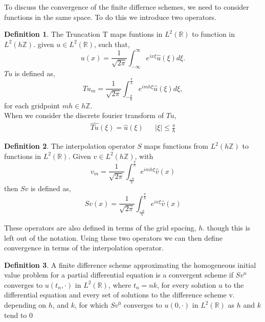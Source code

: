 \documentclass[12pt]{article}
\newcommand{\R}{\mathbb{R}}
\newcommand{\Z}{\mathbb{Z}}
\theoremstyle{definition}
\newtheorem{definition}{Definition}
\begin{document}
To discuss the convergence of the finite differnce schemes, we need to consider functions in the same space. To do this we introduce two operators. 
\begin{definition}
The Truncation T maps funtions in $L^2(\R)$ to function in $L^2(h\Z)$. given $u \in L^2(\R)$, such that,
\begin{equation}
u(x)=\frac{1}{\sqrt{2\pi}}\int_{-\infty}^{\infty}e^{ix\xi}\hat{u}(\xi)d\xi. 
\end{equation}   
$Tu$ is defined as,
\begin{equation}
Tu_m=\frac{1}{\sqrt{2\pi}}\int_{-\frac{\pi}{h}}^{\frac{\pi}{h}}e^{imh\xi}\hat{u}(\xi)d\xi, 
\end{equation}
for each gridpoint $mh\in h\Z$.\\
When we consider the discrete fourier transform of $Tu$,
\begin{align*}
\widehat{Tu}(\xi)=\hat{u}(\xi) && \lvert\xi\rvert\leq \frac{\pi}{h}
\end{align*} 
\end{definition}
\begin{definition}
The interpolation operator $S$  maps functions from $L^2(h\Z)$ to functions in $L^2(\R)$. Given $v \in L^2(h\Z)$, with 
$$ v_m= \frac{1}{\sqrt{2\pi}}\int_{\frac{-\pi}{h}}^{\frac{\pi}{h}} e^{imh\xi}\hat{v}(x)$$
then $Sv$ is defined as,
$$Sv(x)=\frac{1}{\sqrt{2\pi}}\int_{\frac{-\pi}{h}}^{\frac{\pi}{h}} e^{ix\xi}\hat{v}(x)$$
\end{definition}
These operators are also defined in terms of the grid spacing, $h$. though this is left out of the notation.
Using these two operators we can then define convergence in terms of the interpolation operator.
\begin{definition}
A finite difference scheme approximating  the homogeneous initial value problem for a partial differential equation is a convergent scheme if $Sv^n$ converges to $u(t_n,\cdot)$ in $L^2(\R)$, where $t_n=nk$, for every solution $u$ to the differential equation and every set of solutions to the difference scheme v. depending on $h$, and $k$, for which $Sv^0$ converges to $u(0,\cdot)$ in $L^2(\R)$ as $h$ and $k$ tend to $0$
\end{definition}
\end{document}
